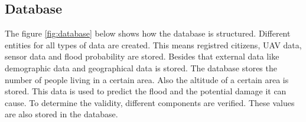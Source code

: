 \subsection{Database}
\label{subsec:databaseview}
The figure \ref{fig:database} below shows how the database is structured. Different entities for all types of data are created. This means registred citizens, UAV data, sensor data and flood probability are stored. Besides that external data like demographic data and geographical data is stored. The database stores the number of people living in a certain area. Also the altitude of a certain area is stored. This data is used to predict the flood and the potential damage it can cause. To determine the validity, different components are verified. These values are also stored in the database. 

\clearpage





